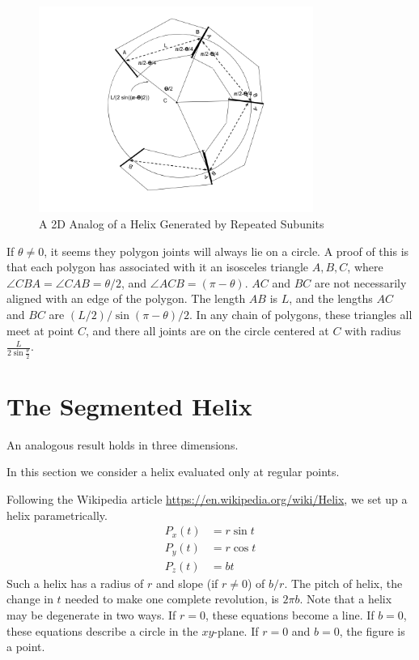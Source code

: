 \documentclass[11pt]{article}
\begin{document}
{\begin{figure}
     \centering
     \includegraphics[width=0.80\textwidth]{figures/2DPolygonStacking.png}
     \caption{A 2D Analog of a Helix Generated by Repeated Subunits}
  \label{fig:prismdiagram}
\end{figure}

If $\theta \neq 0$, it seems they polygon joints will always lie on a circle. A proof of this
is that each polygon has associated with it an isosceles triangle $A,B,C$, where $\angle CBA = \angle CAB = \theta/2$,
and $\angle ACB = (\pi - \theta)$. $AC$ and $BC$ are not necessarily aligned with an edge of the polygon.
The length $AB$ is $L$, and the lengths $AC$ and $BC$ are
$(L/2) / \sin{(\pi - \theta)/2}$. In any chain of polygons, these triangles all meet at point $C$, and there all
joints are on the circle centered at $C$ with radius $\frac{L}{2 \sin{\frac{\theta}{2}}}$.


\label{sec:2d}

\section{The Segmented Helix}

An analogous result holds in three dimensions.

In this section we consider a helix evaluated only at regular points.

Following the Wikipedia article \url{https://en.wikipedia.org/wiki/Helix}, we set up a helix parametrically.
\begin{align*}
    P_x(t) &= r \sin{t}  \\
    P_y(t) &= r \cos{t} \\
   P_z(t) &= b t
\end{align*}
Such a helix has a radius of $r$ and slope (if $r \neq 0$) of $b/r$.
The pitch of helix, the change in $t$ needed to make one complete revolution, is $2\pi b$.
Note that a helix may be degenerate in two ways.
If $r = 0$, these equations become a line. If $b = 0$, these equations describe a circle in the $xy$-plane.
If $r = 0$ and $b = 0$, the figure is a point.

}
\end{document}
